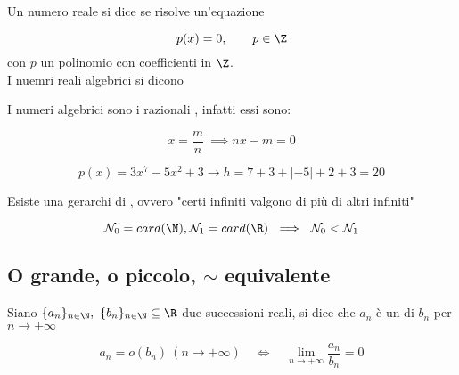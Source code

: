 \documentclass[../appunti.tex]{subfiles}
\begin{document}
\begin{defn}
Un numero reale si dice  se risolve un'equazione 

\begin{equation}
	p(x) = 0, \qquad p \in \Z 
\end{equation}
con $p$ un polinomio con coefficienti in $\Z$.\\
I nuemri reali  algebrici si dicono 
\end{defn}

\begin{dimo}
I numeri algebrici sono i razionali , infatti essi sono:


\begin{equation}
	x = \frac{m}{n}\ \implies 
	nx - m = 0
\end{equation}


\begin{equation}
	p(x) = 3x^7 - 5x^2 + 3 \to h = 7 + 3 + | - 5 | + 2 + 3 = 20
\end{equation}

\end{dimo}


\begin{defn}
Esiste una gerarchi di , ovvero "certi infiniti valgono di più di altri
infiniti" 


\begin{equation}
	\mathcal{N}_0 = card(\N), \mathcal{N}_1 = card(\R)\ \implies\
	\mathcal{N}_0 < \mathcal{N}_1
\end{equation}
\end{defn}

\subsection{O grande, o piccolo, $\sim$ equivalente}

\begin{defn}[o piccolo]
Siano $ \{ a_n \}_{n \in \N},\ \{ b_n \}_{n \in \N} \subseteq \R $ due successioni
reali, si dice che $a_n$ è un \tit{"o piccolo"} di $b_n$ per $n \to + \infty$

\begin{equation}
	a_n = o(b_n) \ ( n \to + \infty) \quad \iff \quad
	\lim \limits_{n \to + \infty} \frac{a_n}{b_n} = 0
\end{equation}
\end{defn}
\end{document}
